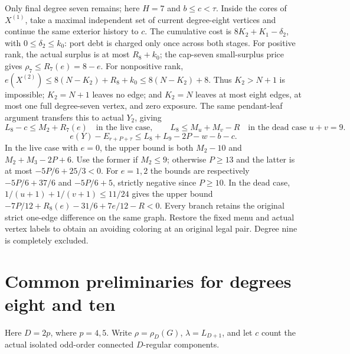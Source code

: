 \documentclass[11pt,a4paper]{article}
\theoremstyle{definition}
\begin{document}
Only final degree seven remains; here $H=7$ and $b\le c<\tau$.
Inside the cores of $X^{(1)}$, take a maximal independent set of current degree-eight vertices and continue the same exterior history to $c$. The cumulative cost is
$8K_2+K_1-\delta_2$, with $0\le\delta_2\le k_0$: port debt is charged only once across both stages.
For positive rank, the actual surplus is at most $R_8+k_0$; the cap-seven small-surplus price gives $\rho_7\le R_7(e)=8-e$.
For nonpositive rank,
$e(X^{(2)})\le8(N-K_2)+R_8+k_0\le8(N-K_2)+8$.
Thus $K_2>N+1$ is impossible; $K_2=N+1$ leaves no edge; and $K_2=N$ leaves at most eight edges, at most one full degree-seven vertex, and zero exposure.
The same pendant-leaf argument transfers this to actual $Y_2$, giving
\[
L_8-c\le M_2+R_7(e)\quad\text{in the live case},\qquad
L_8\le M_u+M_v-R\quad\text{in the dead case }u+v=9.
\]
\[
e(Y)-E_{r+P+\tau}\le L_8+L_9-2P-w-b-c.
\]
In the live case with $e=0$, the upper bound is both
$M_2-10$ and $M_2+M_3-2P+6$.
Use the former if $M_2\le9$; otherwise $P\ge13$ and the latter is at most $-5P/6+25/3<0$.
For $e=1,2$ the bounds are respectively $-5P/6+37/6$ and $-5P/6+5$, strictly negative since $P\ge10$.
In the dead case, $1/(u+1)+1/(v+1)\le11/24$ gives the upper bound
$-7P/12+R_8(e)-31/6+7e/12-R<0$.
Every branch retains the original strict one-edge difference on the same graph. Restore the fixed menu and actual vertex labels to obtain an avoiding coloring at an original legal pair. Degree nine is completely excluded.
\section{Common preliminaries for degrees eight and ten}\label{app:even-small}
Here $D=2p$, where $p=4,5$. Write $\rho=\rho_D(G)$, $\lambda=L_{D+1}$, and let $c$ count the actual isolated odd-order connected $D$-regular components.
\end{document}
